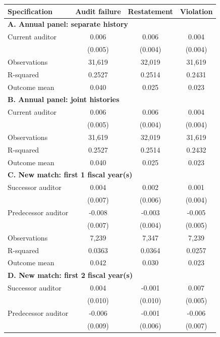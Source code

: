 \documentclass[10pt]{article}
\begin{document}
\begin{minipage}{19cm}\fontsize{10}{12}\selectfont\setlength{\tabcolsep}{4pt}\renewcommand{\arraystretch}{1.12}


\centering
{}
\begin{threeparttable}
\begin{tabular}{p{}ccc}
\toprule
Specification & Audit failure & Restatement & Violation \\
\midrule
\multicolumn{4}{l}{\textbf{A. Annual panel: separate history}} \\
Current auditor & 0.006 & 0.006 & 0.004 \\
 & (0.005) & (0.004) & (0.004) \\
Observations & 31,619 & 32,019 & 31,619 \\
R-squared & 0.2527 & 0.2514 & 0.2431 \\
Outcome mean & 0.040 & 0.025 & 0.023 \\
\multicolumn{4}{l}{\textbf{B. Annual panel: joint histories}} \\
Current auditor & 0.006 & 0.006 & 0.004 \\
 & (0.005) & (0.004) & (0.004) \\
Observations & 31,619 & 32,019 & 31,619 \\
R-squared & 0.2527 & 0.2514 & 0.2432 \\
Outcome mean & 0.040 & 0.025 & 0.023 \\
\multicolumn{4}{l}{\textbf{C. New match: first 1 fiscal year(s)}} \\
Successor auditor & 0.004 & 0.002 & 0.001 \\
 & (0.007) & (0.006) & (0.004) \\
Predecessor auditor & -0.008 & -0.003 & -0.005 \\
 & (0.007) & (0.004) & (0.005) \\
Observations & 7,239 & 7,347 & 7,239 \\
R-squared & 0.0363 & 0.0364 & 0.0257 \\
Outcome mean & 0.042 & 0.030 & 0.023 \\
\multicolumn{4}{l}{\textbf{D. New match: first 2 fiscal year(s)}} \\
Successor auditor & 0.004 & -0.001 & 0.007 \\
 & (0.010) & (0.010) & (0.005) \\
Predecessor auditor & -0.006 & -0.001 & -0.006 \\
 & (0.009) & (0.006) & (0.007) \\

\end{tabular}
\end{threeparttable}
\end{minipage}
\end{document}
